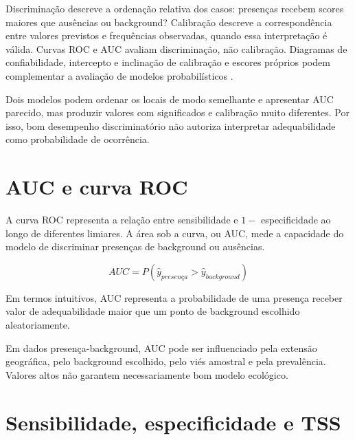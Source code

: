 Discriminação descreve a ordenação relativa dos casos: presenças recebem scores
maiores que ausências ou background? Calibração descreve a correspondência entre
valores previstos e frequências observadas, quando essa interpretação é válida.
Curvas ROC e AUC avaliam discriminação, não calibração. Diagramas de confiabilidade,
intercepto e inclinação de calibração e escores próprios podem complementar a
avaliação de modelos probabilísticos \parencite{vaughan2005testing,jimenezvalverde2013discrimination}.

\begin{conceito}[title={\faBalanceScale\quad Um modelo pode acertar a ordem e errar a magnitude}]
	Dois modelos podem ordenar os locais de modo semelhante e apresentar AUC
	parecido, mas produzir valores com significados e calibração muito diferentes.
Por isso, bom desempenho discriminatório não autoriza interpretar adequabilidade
como probabilidade de ocorrência.
\end{conceito}

\section{AUC e curva ROC}

A curva ROC representa a relação entre sensibilidade e \(1 -\) especificidade ao longo de diferentes limiares. A área sob a curva, ou AUC, mede a capacidade do modelo de discriminar presenças de background ou ausências.

\begin{equationbox}
	\[
	AUC = P(\hat{y}_{presença} > \hat{y}_{background})
	\]
\end{equationbox}

Em termos intuitivos, AUC representa a probabilidade de uma presença receber valor de adequabilidade maior que um ponto de background escolhido aleatoriamente.

\begin{atencao}[title={\faExclamationTriangle\quad Limitações do AUC}]
	Em dados presença-background, AUC pode ser influenciado pela extensão geográfica, pelo background escolhido, pelo viés amostral e pela prevalência. Valores altos não garantem necessariamente bom modelo ecológico.
\end{atencao}

\section{Sensibilidade, especificidade e TSS}


